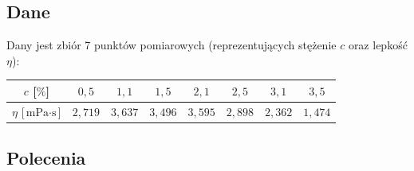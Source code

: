 \documentclass[a4paper,11pt]{article}
\begin{document}
\subsection*{Dane}

Dany jest zbiór 7 punktów pomiarowych (reprezentujących stężenie $c$ oraz lepkość $\eta$):

\begin{center}
\begin{tabular}{c|ccccccc}
  \toprule
  $c$ [$\%$] & $0{,}5$ & $1{,}1$ & $1{,}5$ & $2{,}1$ & $2{,}5$ & $3{,}1$ & $3{,}5$ \\
  \midrule
  $\eta$ [$\text{mPa}\cdot\text{s}$] & $2{,}719$ & $3{,}637$ & $3{,}496$ & $3{,}595$ & $2{,}898$ & $2{,}362$ & $1{,}474$ \\
  \bottomrule
\end{tabular}
\end{center}

\subsection*{Polecenia}
\end{document}
